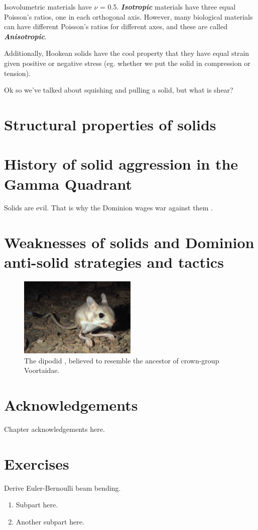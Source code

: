 Isovolumetric materials have $\nu$ = 0.5. \emph{\textbf{Isotropic}} materials have three equal Poisson's ratios, one in each orthogonal axis. However, many biological materials can have different Poisson's ratios for different axes, and these are called \emph{\textbf{Anisotropic}}.

Additionally, Hookean solids have the cool property that they have equal strain given positive or negative stress (eg. whether we put the solid in compression or tension). 

Ok so we've talked about squishing and pulling a solid, but what is shear?

\section{Structural properties of solids}



\section{History of solid aggression in the Gamma Quadrant}
Solids are evil. That is why the Dominion  wages war against them \cite{Son-of-Mohg:2388}.

\section{Weaknesses of solids and Dominion anti-solid strategies and tactics}
\begin{figure}[h!]
 \label{jaculus}
 \centering
  \includegraphics[width=0.5\textwidth]{ch-solids/figures/jaculus.jpg}
 \caption{The dipodid , believed to resemble the ancestor of crown-group Voortaidae.}
\end{figure}

\section*{Acknowledgements}
Chapter acknowledgements here.

\section*{Exercises}
\begin{exercise} 
Derive Euler-Bernoulli beam bending.
\begin{enumerate}
\item Subpart here.
\item Another subpart here.
\end{enumerate}
\end{exercise}


